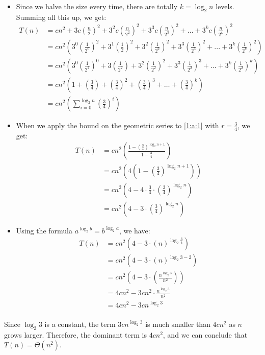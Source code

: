 \documentclass{article}
\begin{document}
	  \begin{itemize}
		\item Since we halve the size every time, there are totally \( k = \log_{2}n \) levels. Summing all this up, we get:
		\begin{align}
			T(n) &= cn^2 + 3c\left(\frac{n}{2}\right)^2 + 3^2c\left(\frac{n}{2^2}\right)^2 + 3^3c\left(\frac{n}{2^3}\right)^2 + \ldots + 3^kc\left(\frac{n}{2^k}\right)^2 \label{eq:initial_sum} \\
				 &=  cn^2 \left( 3^0 \left(\frac{1}{2^0}\right)^2 + 3^1 \left(\frac{1}{2}\right)^2 +  3^2 \left(\frac{1}{2^2}\right)^2 + 3^3 \left(\frac{1}{2^3}\right)^2 + ... + 3^k \left(\frac{1}{2^k}\right)^2 \right) \\
				 &=  cn^2 \left( 3^0 \left(\frac{1}{2^2}\right)^0 + 3 \left(\frac{1}{2^2}\right) +  3^2 \left(\frac{1}{2^2}\right)^2 + 3^3 \left(\frac{1}{2^2}\right)^3 + ... + 3^k \left(\frac{1}{2^2}\right)^k \right) \\
				 &=  cn^2 \left( 1 + \left(\frac{3}{4}\right) +  \left(\frac{3}{4}\right)^2 + \left(\frac{3}{4}\right)^3 + \ldots + \left(\frac{3}{4}\right)^k \right) \\
				 &= cn^2 \left( \sum_{i = 0}^{\log_{2}n} \left(\frac{3}{4}\right)^i \right) \label{1:a:1}
		\end{align}
		\item When we apply the bound on the geometric series to \eqref{1:a:1} with \( r = \frac{3}{4} \), we get:
		\begin{align}
			T(n) &= cn^2 \left( \frac{1 - \left(\frac{3}{4}\right)^{\log_2n + 1}}{1 - \frac{3}{4}} \right) \\
				 &= cn^2 \left( 4 \left( 1 - \left(\frac{3}{4}\right)^{\log_2n + 1} \right) \right) \\
				 &= cn^2 \left( 4 - 4 \cdot \frac{3}{4} \cdot \left(\frac{3}{4}\right)^{\log_2n} \right) \\
				 &=  cn^2 \left( 4 - 3 \cdot \left(\frac{3}{4}\right)^{\log_2n} \right) 
		\end{align}
		\item Using the formula \(a^{\log_2b} = b^{\log_2a} \), we have:
		\begin{align*}
			T(n) &=  cn^2 \left( 4 - 3 \cdot \left(n\right)^{\log_2\frac{3}{4}} \right) \\
				 &= cn^2 \left( 4 - 3 \cdot \left(n\right)^{\log_2 3 - 2} \right) \\
				 &= cn^2 \left( 4 - 3 \cdot \left(\frac{n^{\log_2 3}}{n^2}\right) \right) \\
				 &= 4cn^2 - 3cn^2 \cdot \frac{n^{\log_2 3}}{n^2} \\
				 &= 4cn^2 - 3cn^{\log_2 3} \\
		\end{align*}
	\end{itemize}
	Since \(\log_2 3\) is a constant, the term \(3cn^{\log_2 3}\) is much smaller than \(4cn^2\) as \(n\) grows larger. Therefore, the dominant term is \(4cn^2\), and we can conclude that \(T(n) = \Theta(n^2)\).
\end{document}
